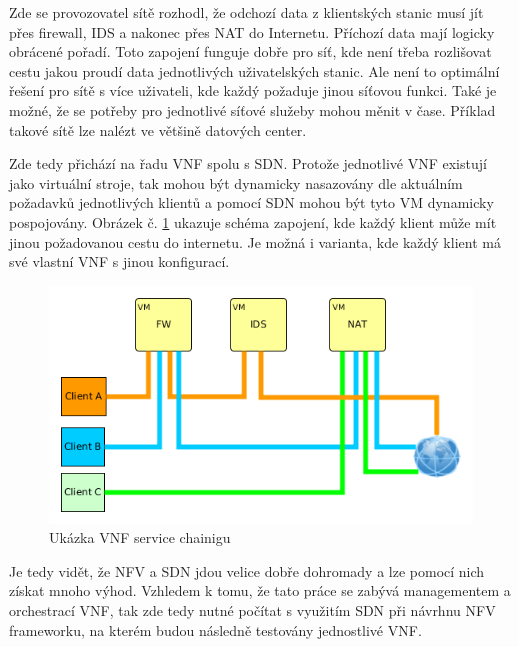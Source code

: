 Zde se provozovatel sítě rozhodl, že odchozí data z klientských stanic musí jít přes firewall, IDS a nakonec přes NAT do Internetu. Příchozí data mají logicky obrácené pořadí. Toto zapojení funguje dobře pro síť, kde není třeba rozlišovat cestu jakou proudí data jednotlivých uživatelských stanic. Ale není to optimální řešení pro sítě s více uživateli, kde každý požaduje jinou síťovou funkci. Také je možné, že se potřeby pro jednotlivé síťové služeby mohou měnit v čase. Příklad takové sítě lze nalézt ve většině datových center. 

Zde tedy přichází na řadu VNF spolu s SDN. Protože jednotlivé VNF existují jako virtuální stroje, tak mohou být dynamicky nasazovány dle aktuálním požadavků jednotlivých klientů a pomocí SDN mohou být tyto VM dynamicky pospojovány. Obrázek č. \ref{fig:service_chaining_new} ukazuje schéma zapojení, kde každý klient může mít jinou požadovanou cestu do internetu. Je možná i varianta, kde každý klient má své vlastní VNF s jinou konfigurací.

\begin{figure}[h]
\begin{centering}
\includegraphics[scale=0.55]{images/service_chaining_new}
\par\end{centering}
\caption{Ukázka VNF service chainigu\label{fig:service_chaining_new}}
\end{figure}

Je tedy vidět, že NFV a SDN jdou velice dobře dohromady a lze pomocí nich získat mnoho výhod. Vzhledem k tomu, že tato práce se zabývá managementem a orchestrací VNF, tak zde tedy nutné počítat s využitím SDN při návrhnu NFV frameworku, na kterém budou následně testovány jednostlivé VNF.